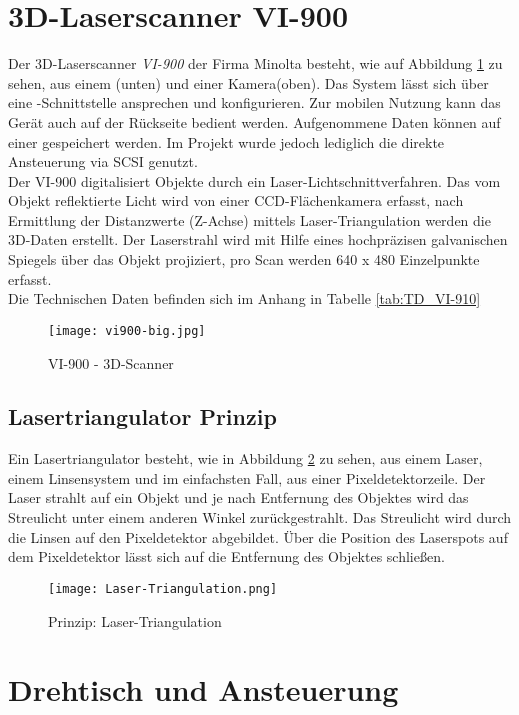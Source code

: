 \section{3D-Laserscanner VI-900}
\label{sec:VI-900}
Der 3D-Laserscanner \emph{VI-900} der Firma Minolta besteht, wie auf Abbildung \ref{fig:VI900} zu sehen, aus einem (unten) und einer Kamera(oben). Das System lässt sich über eine -Schnittstelle ansprechen und konfigurieren. Zur mobilen Nutzung kann das Gerät auch auf der Rückseite bedient werden. Aufgenommene Daten können auf einer  gespeichert werden. Im Projekt wurde jedoch lediglich die direkte Ansteuerung via SCSI genutzt.\\
Der VI-900 digitalisiert Objekte durch ein Laser-Lichtschnittverfahren. Das vom Objekt reflektierte Licht wird von einer CCD-Flächenkamera erfasst, nach Ermittlung der Distanzwerte (Z-Achse) mittels Laser-Triangulation werden die 3D-Daten erstellt. Der Laserstrahl wird mit Hilfe eines hochpräzisen galvanischen Spiegels über das Objekt projiziert, pro Scan werden 640 x 480 Einzelpunkte erfasst.\cite{Minolta:Einleitung}\\
Die Technischen Daten befinden sich im Anhang in Tabelle \ref{tab:TD_VI-910}
\begin{figure}[htb]
\centering
\texttt{[image: vi900-big.jpg]}
\caption{VI-900 - 3D-Scanner}
\label{fig:VI900}
\end{figure}
\subsection{Lasertriangulator Prinzip}
\label{sec:LaserTri}
Ein Lasertriangulator besteht, wie in Abbildung \ref{fig:LaserTriangulator} zu sehen, aus einem Laser, einem Linsensystem und im einfachsten Fall, aus einer Pixeldetektorzeile. Der Laser strahlt auf ein Objekt und je nach Entfernung des Objektes wird das Streulicht unter einem anderen Winkel zurückgestrahlt. Das Streulicht wird durch die Linsen auf den Pixeldetektor abgebildet. Über die Position des Laserspots auf dem Pixeldetektor lässt sich auf die Entfernung des Objektes schließen.
\begin{figure}[h]
\centering
\texttt{[image: Laser-Triangulation.png]}
\caption{Prinzip: Laser-Triangulation}
\label{fig:LaserTriangulator}
\end{figure}

\section{Drehtisch und Ansteuerung}
\label{sec:AnsteuerungDrehtisch}
